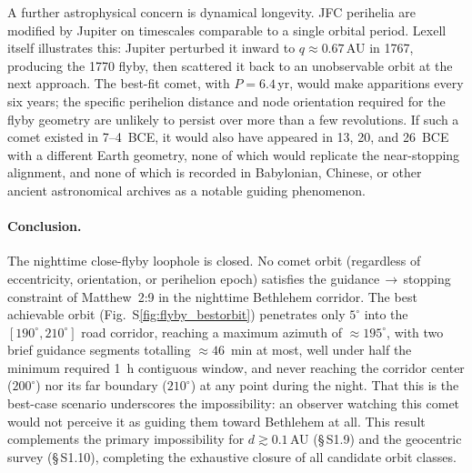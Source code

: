 \documentclass[11pt,a4paper]{article}
\begin{document}
A further astrophysical concern is dynamical longevity. JFC perihelia are modified
by Jupiter on timescales comparable to a single orbital period. Lexell itself
illustrates this: Jupiter perturbed it inward to $q \approx 0.67$\,AU in 1767,
producing the 1770 flyby, then scattered it back to an unobservable orbit at the
next approach. The best-fit comet, with $P = 6.4$\,yr, would make apparitions
every six years; the specific perihelion distance and node orientation required for
the flyby geometry are unlikely to persist over more than a few revolutions.
If such a comet existed in 7--4~BCE, it would also have appeared in 13, 20,
and 26~BCE with a different Earth geometry, none of which would replicate the
near-stopping alignment, and none of which is recorded in Babylonian, Chinese,
or other ancient astronomical archives as a notable guiding phenomenon.

\paragraph{Conclusion.}
The nighttime close-flyby loophole is closed. No comet orbit (regardless of
eccentricity, orientation, or perihelion epoch) satisfies the
guidance\,$\to$\,stopping constraint of Matthew~2:9 in the nighttime Bethlehem
corridor. The best achievable orbit (Fig.~S\ref{fig:flyby_bestorbit}) penetrates only
$5^\circ$ into the $[190^\circ, 210^\circ]$ road corridor, reaching a maximum
azimuth of $\approx\!195^\circ$, with two brief guidance segments totalling
$\approx\!46$~min at most, well under half the minimum required 1~h contiguous
window, and never reaching the corridor center ($200^\circ$) nor its far
boundary ($210^\circ$) at any point during the night. That this is the best-case scenario underscores the
impossibility: an observer watching this comet would not perceive it as guiding
them toward Bethlehem at all. This result complements the primary impossibility
for $d \gtrsim 0.1$\,AU (\S\,S1.9) and the geocentric survey (\S\,S1.10),
completing the exhaustive closure of all candidate orbit classes.
\end{document}
